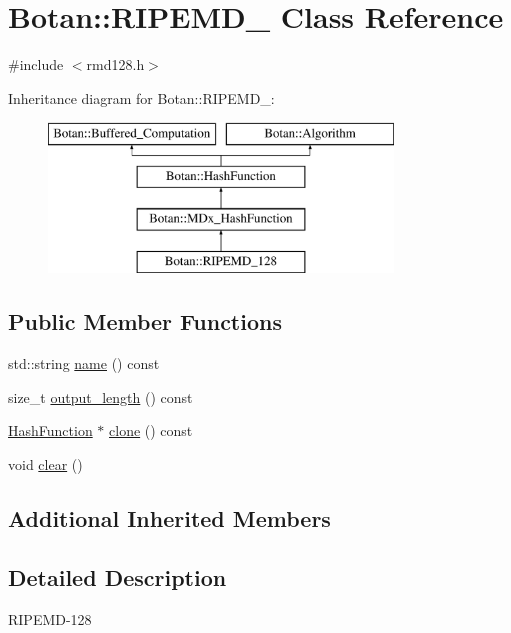 \hypertarget{classBotan_1_1RIPEMD__128}{\section{Botan\-:\-:R\-I\-P\-E\-M\-D\-\_ Class Reference}
\label{classBotan_1_1RIPEMD__128}
}


{\ttfamily \#include $<$rmd128.\-h$>$}

Inheritance diagram for Botan\-:\-:R\-I\-P\-E\-M\-D\-\_\-:\begin{figure}[H]
\begin{center}
\leavevmode
\includegraphics[height=4.000000cm]{classBotan_1_1RIPEMD__128}
\end{center}
\end{figure}
\subsection*{Public Member Functions}
\begin{DoxyCompactItemize}
\item 
std\-::string \hyperlink{classBotan_1_1RIPEMD__128_ad5d34be048fbe5b00a496c256801e615}{name} () const 
\item 
size\-\_\-t \hyperlink{classBotan_1_1RIPEMD__128_aeb3d978a15cb70a337831b3a80b0cb3f}{output\-\_\-length} () const 
\item 
\hyperlink{classBotan_1_1HashFunction}{Hash\-Function} $\ast$ \hyperlink{classBotan_1_1RIPEMD__128_a3be4ecadfa51ddc02fbab852bb386e02}{clone} () const 
\item 
void \hyperlink{classBotan_1_1RIPEMD__128_a8331b091a66aacf0b5b75ea0cd3a84af}{clear} ()
\end{DoxyCompactItemize}
\subsection*{Additional Inherited Members}


\subsection{Detailed Description}
R\-I\-P\-E\-M\-D-\/128 

